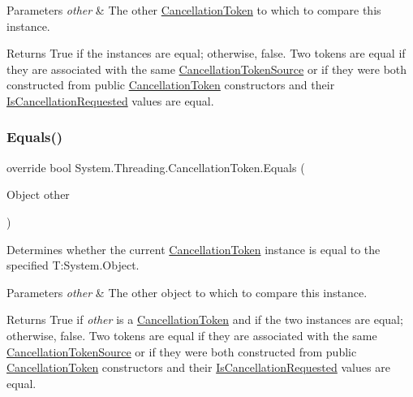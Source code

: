 \begin{DoxyParams}{Parameters}
{\em other} & The other \hyperlink{}{Cancellation\+Token} to which to compare this instance.\\
\hline
\end{DoxyParams}
\begin{DoxyReturn}{Returns}
True if the instances are equal; otherwise, false. Two tokens are equal if they are associated with the same \hyperlink{}{Cancellation\+Token\+Source} or if they were both constructed from public \hyperlink{struct_system_1_1_threading_1_1_cancellation_token}{Cancellation\+Token} constructors and their \hyperlink{struct_system_1_1_threading_1_1_cancellation_token_a1b0338d63f9b268339e7348629301748}{Is\+Cancellation\+Requested} values are equal.
\end{DoxyReturn}
\mbox{\label{struct_system_1_1_threading_1_1_cancellation_token_a4ceccecd3848e694f1b5e4d7d8c60002}} 
\subsubsection{\texorpdfstring{Equals()}{Equals()}\hspace{0.1cm}{\footnotesize\ttfamily [2/2]}}
{\footnotesize\ttfamily override bool System.\+Threading.\+Cancellation\+Token.\+Equals (\begin{DoxyParamCaption}\item[{Object}]{other }\end{DoxyParamCaption})\hspace{0.3cm}{\ttfamily [inline]}}



Determines whether the current \hyperlink{}{Cancellation\+Token} instance is equal to the specified T\+:\+System.\+Object. 


\begin{DoxyParams}{Parameters}
{\em other} & The other object to which to compare this instance.\\
\hline
\end{DoxyParams}
\begin{DoxyReturn}{Returns}
True if {\itshape other}  is a \hyperlink{}{Cancellation\+Token} and if the two instances are equal; otherwise, false. Two tokens are equal if they are associated with the same \hyperlink{}{Cancellation\+Token\+Source} or if they were both constructed from public \hyperlink{struct_system_1_1_threading_1_1_cancellation_token}{Cancellation\+Token} constructors and their \hyperlink{struct_system_1_1_threading_1_1_cancellation_token_a1b0338d63f9b268339e7348629301748}{Is\+Cancellation\+Requested} values are equal.
\end{DoxyReturn}

